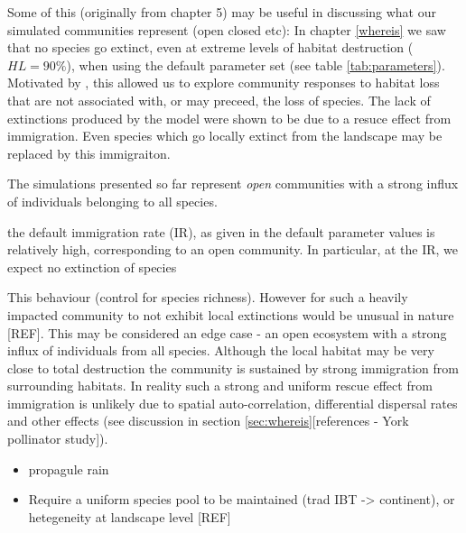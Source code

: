 Some of this (originally from chapter 5) may be useful in discussing what our simulated communities represent (open closed etc):
In chapter \ref{whereis} we saw that no species go extinct, even at extreme levels of habitat destruction ($HL=90\%$), when using the default parameter set (see table \ref{tab:parameters}). Motivated by \cite{tylianakis2007habitat}, this allowed us to explore community responses to habitat loss that are not associated with, or may preceed, the loss of species. The lack of extinctions produced by the model were shown to be due to a resuce effect from immigration. Even species which go locally extinct from the landscape may be replaced by this immigraiton.    

The simulations presented so far represent \emph{open} communities with a strong influx of individuals belonging to all species.

the default immigration rate (IR), as given in the default parameter values  is relatively high, corresponding to an open community. In particular, at the IR, we expect no extinction of species

This behaviour  (control for species richness). However for such a heavily impacted community to not exhibit local extinctions would be unusual in nature [REF]. This may be considered an edge case - an open ecosystem with a strong influx of individuals from all species. Although the local habitat may be very close to total destruction the community is sustained by strong immigration from surrounding habitats. In reality such a strong and uniform rescue effect from immigration is unlikely due to spatial auto-correlation, differential dispersal rates and other effects (see discussion in section \ref{sec:whereis}[references - York pollinator study]).

\begin{itemize}
	\item propagule rain
	\item Require a uniform species pool to be maintained (trad IBT -> continent), or hetegeneity at landscape level [REF]
\end{itemize}

